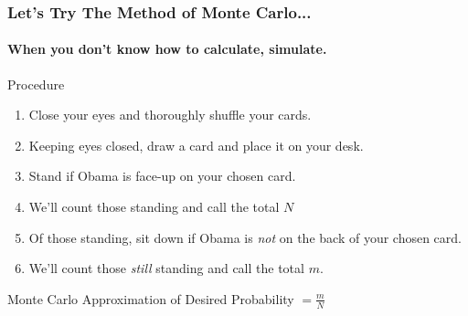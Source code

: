 \documentclass{beamer}
\begin{document}
\begin{frame}
\frametitle{Let's Try The Method of Monte Carlo...}
\framesubtitle{When you don't know how to calculate, simulate.}
Procedure
\begin{enumerate}
\item Close your eyes and thoroughly shuffle your cards.
\item Keeping eyes closed, draw a card and place it on your desk.
\item Stand if Obama is face-up on your chosen card. 
\item We'll count those standing and call the total $N$
\item Of those standing, sit down if Obama is \emph{not} on the back of your chosen card.
\item We'll count those \emph{still} standing and call the total $m$.
\end{enumerate}

\begin{alertblock}{Monte Carlo Approximation of Desired Probability $\displaystyle= \frac{m}{N}$}\end{alertblock}
\end{frame}
\end{document}
